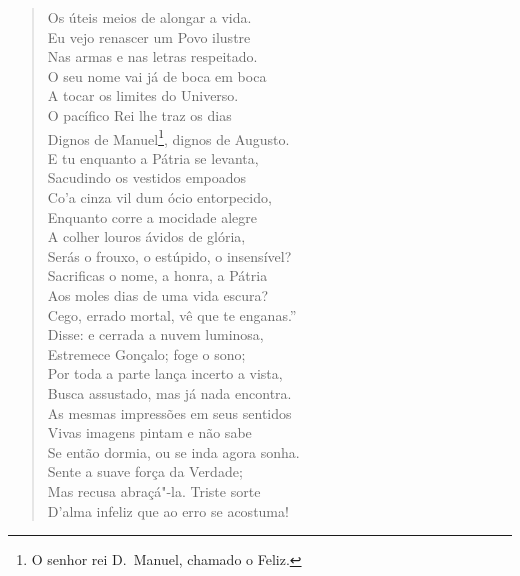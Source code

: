\begin{verse}
Os úteis meios de alongar a vida.\\
Eu vejo renascer um Povo ilustre\\
Nas armas e nas letras respeitado.\\
O seu nome vai já de boca em boca\\
A tocar os limites do Universo.\\
O pacífico Rei lhe traz os dias\\
Dignos de Manuel\footnote{ O senhor rei D.~Manuel, chamado o Feliz.},
dignos de Augusto.\\			\index{\Aug}
E tu enquanto a Pátria se levanta,\\
Sacudindo os vestidos empoados\\
Co'a cinza vil dum ócio entorpecido,\\
Enquanto corre a mocidade alegre\\
A colher louros ávidos de glória,\\			\index{\Lour}
Serás o frouxo, o estúpido, o insensível?\\
Sacrificas o nome, a honra, a Pátria\\
Aos moles dias de uma vida escura?\\
Cego, errado mortal, vê que te enganas.''\\
Disse: e cerrada a nuvem luminosa,\\
Estremece Gonçalo; foge o sono;\\
Por toda a parte lança incerto a vista,\\
Busca assustado, mas já nada encontra.\\
As mesmas impressões em seus sentidos\\
Vivas imagens pintam e não sabe\\
Se então dormia, ou se inda agora sonha.\\
Sente a suave força da Verdade;\\
Mas recusa abraçá"-la. Triste sorte\\
D'alma infeliz que ao erro se acostuma! \\[10pt]



\end{verse}
